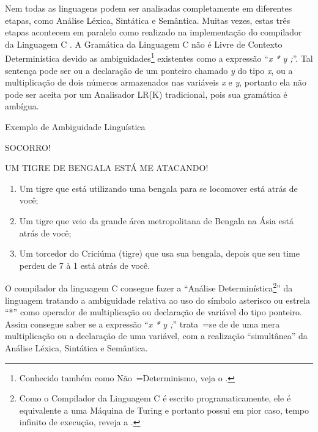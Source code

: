 Nem todas as linguagens podem ser analisadas completamente em diferentes etapas,
como Análise Léxica, Sintática e Semântica. Muitas vezes,
estas três etapas acontecem em paralelo como realizado na implementação do compilador da Linguagem C \cite{jourdan2017,whyCcannotBeParsedWithALR1Parser}.
A Gramática da Linguagem C não é Livre de Contexto Determinística devido as ambiguidades\footnote{
Conhecido também como Não~=Determinismo,
veja o .
}
existentes como a expressão ``\textit{x * y ;}''.
Tal sentença pode ser ou
a declaração de um ponteiro chamado \textit{y} do tipo \textit{x},
ou a multiplicação de dois números armazenados nas variáveis \textit{x} e
\textit{y},
portanto ela não pode ser aceita por um Analisador LR(K) tradicional,
pois sua gramática é ambígua.

\begin{quadro}[h]
\caption{Exemplo de Ambiguidade Linguística}
\label{exemploDeAmbiguidadeLinguistica}
\begin{bluebox}
    SOCORRO!

    UM TIGRE DE BENGALA ESTÁ ME ATACANDO!

    \begin{enumerate}%
        \item Um tigre que está utilizando uma bengala para se locomover está atrás de você;
        \item Um tigre que veio da grande área metropolitana de Bengala na Ásia está atrás de você;
        \item Um torcedor do Criciúma (tigre) que usa sua bengala,
        depois que seu time perdeu de 7 à 1 está atrás de você.
    \end{enumerate}
\end{bluebox}
\end{quadro}

O compilador da linguagem C consegue fazer a ``Análise Determinística\footnote{
Como o Compilador da Linguagem C é escrito programaticamente,
ele é equivalente a uma Máquina de Turing e
portanto possui em pior caso,
tempo infinito de execução,
reveja a .
}'' da linguagem tratando a ambiguidade relativa ao uso do símbolo asterisco ou
estrela ``*'' como operador de multiplicação ou
declaração de variável do tipo ponteiro.
Assim consegue saber se a expressão ``\textit{x * y ;}'' trata~=se de de uma mera multiplicação ou
a declaração de uma variável,
com a realização ``simultânea'' da Análise Léxica,
Sintática e
Semântica.

